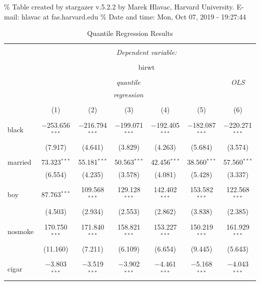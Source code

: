 \documentclass[]{book}
\begin{document}
\% Table created by stargazer v.5.2.2 by Marek Hlavac, Harvard
University. E-mail: hlavac at fas.harvard.edu \% Date and time: Mon, Oct
07, 2019 - 19:27:44

\begin{table}[!htbp] \centering 
  \caption{Quantile Regression Results} 
  \label{tab:} 
\begin{tabular}{@{\extracolsep{5pt}}lcccccc} 
\\[-1.8ex]\hline 
\hline \\[-1.8ex] 
 & \multicolumn{6}{c}{\textit{Dependent variable:}} \\ 
\cline{2-7} 
\\[-1.8ex] & \multicolumn{6}{c}{birwt} \\ 
\\[-1.8ex] & \multicolumn{5}{c}{\textit{quantile}} & \textit{OLS} \\ 
 & \multicolumn{5}{c}{\textit{regression}} & \textit{} \\ 
\\[-1.8ex] & (1) & (2) & (3) & (4) & (5) & (6)\\ 
\hline \\[-1.8ex] 
 black & $-$253.656$^{***}$ & $-$216.794$^{***}$ & $-$199.071$^{***}$ & $-$192.405$^{***}$ & $-$182.087$^{***}$ & $-$220.271$^{***}$ \\ 
  & (7.917) & (4.641) & (3.829) & (4.263) & (5.684) & (3.574) \\ 
  & & & & & & \\ 
 married & 73.323$^{***}$ & 55.181$^{***}$ & 50.563$^{***}$ & 42.456$^{***}$ & 38.560$^{***}$ & 57.560$^{***}$ \\ 
  & (6.554) & (4.235) & (3.578) & (4.081) & (5.428) & (3.337) \\ 
  & & & & & & \\ 
 boy & 87.763$^{***}$ & 109.568$^{***}$ & 129.128$^{***}$ & 142.402$^{***}$ & 153.582$^{***}$ & 122.568$^{***}$ \\ 
  & (4.503) & (2.934) & (2.553) & (2.862) & (3.838) & (2.385) \\ 
  & & & & & & \\ 
 nosmoke & 170.750$^{***}$ & 171.840$^{***}$ & 158.821$^{***}$ & 153.227$^{***}$ & 150.219$^{***}$ & 161.929$^{***}$ \\ 
  & (11.160) & (7.211) & (6.109) & (6.654) & (9.445) & (5.643) \\ 
  & & & & & & \\ 
 cigar & $-$3.803$^{***}$ & $-$3.519$^{***}$ & $-$3.902$^{***}$ & $-$4.461$^{***}$ & $-$5.168$^{***}$ & $-$4.043$^{***}$ \\ 

\end{tabular}
\end{table}
\end{document}
